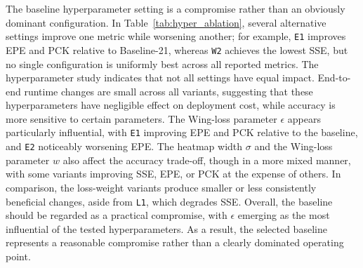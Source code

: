\documentclass[10pt,letterpaper]{article}
\begin{document}
\medskip
\noindent
The baseline hyperparameter setting is a compromise rather than an obviously dominant configuration. In Table~\ref{tab:hyper_ablation}, several alternative settings improve one metric while worsening another; for example, \texttt{E1} improves EPE and PCK relative to Baseline-21, whereas \texttt{W2} achieves the lowest SSE, but no single configuration is uniformly best across all reported metrics. The hyperparameter study indicates that not all settings have equal impact. End-to-end runtime changes are small across all variants, suggesting that these hyperparameters have negligible effect on deployment cost, while accuracy is more sensitive to certain parameters. The Wing-loss parameter \(\epsilon\) appears particularly influential, with \texttt{E1} improving EPE and PCK relative to the baseline, and \texttt{E2} noticeably worsening EPE. The heatmap width \(\sigma\) and the Wing-loss parameter \(w\) also affect the accuracy trade-off, though in a more mixed manner, with some variants improving SSE, EPE, or PCK at the expense of others. In comparison, the loss-weight variants produce smaller or less consistently beneficial changes, aside from \texttt{L1}, which degrades SSE. Overall, the baseline should be regarded as a practical compromise, with \(\epsilon\) emerging as the most influential of the tested hyperparameters. As a result, the selected baseline represents a reasonable compromise rather than a clearly dominated operating point.
\end{document}
